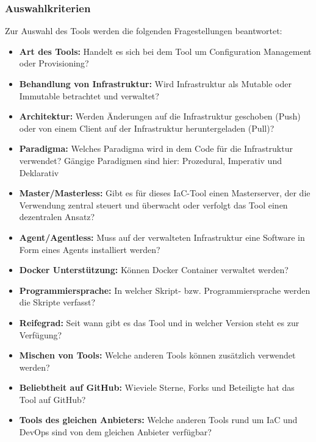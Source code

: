 \subsubsection{Auswahlkriterien}\label{iac_kriterien}

Zur Auswahl des Tools werden die folgenden Fragestellungen beantwortet:

\begin{itemize}
    \item \textbf{Art des Tools:}
    Handelt es sich bei dem Tool um Configuration Management oder Provisioning?

    \item \textbf{Behandlung von Infrastruktur:}
    Wird Infrastruktur als Mutable oder Immutable betrachtet und verwaltet?

    \item \textbf{Architektur:}
    Werden Änderungen auf die Infrastruktur geschoben (Push) oder von einem Client auf der Infrastruktur heruntergeladen (Pull)?

    \item \textbf{Paradigma:}
    Welches Paradigma wird in dem Code für die Infrastruktur verwendet?
    Gängige Paradigmen sind hier: Prozedural, Imperativ und Deklarativ

    \item \textbf{Master/Masterless:}
    Gibt es für dieses IaC-Tool einen Masterserver, der die Verwendung zentral steuert und überwacht oder verfolgt das Tool einen dezentralen Ansatz?

    \item \textbf{Agent/Agentless:}
    Muss auf der verwalteten Infrastruktur eine Software in Form eines Agents installiert werden?

    \item \textbf{Docker Unterstützung:}
    Können Docker Container verwaltet werden?

    \item \textbf{Programmiersprache:}
    In welcher Skript- bzw. Programmiersprache werden die Skripte verfasst?

    \item \textbf{Reifegrad:}
    Seit wann gibt es das Tool und in welcher Version steht es zur Verfügung?

    \item \textbf{Mischen von Tools:}
    Welche anderen Tools können zusätzlich verwendet werden?

    \item \textbf{Beliebtheit auf GitHub:}
    Wieviele Sterne, Forks und Beteiligte hat das Tool auf GitHub?

    \item \textbf{Tools des gleichen Anbieters:}
    Welche anderen Tools rund um IaC und DevOps sind von dem gleichen Anbieter verfügbar?

\end{itemize}
